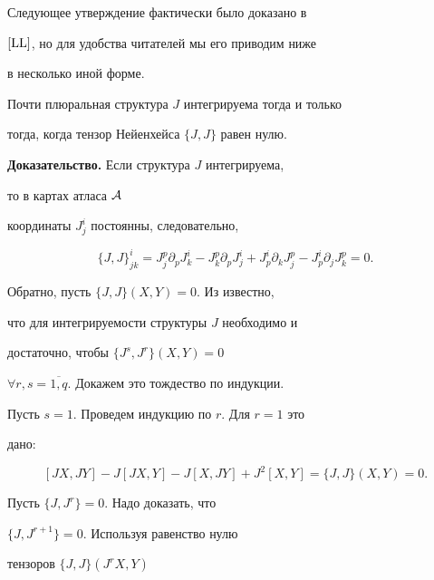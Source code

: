 Следующее утверждение фактически было доказано в


$\cite{LL}$, но для удобства читателей мы его приводим ниже


в несколько иной форме.





\begin{assrt}


Почти плюральная структура $J$ интегрируема тогда и только


тогда, когда тензор Нейенхейса $\{ J,J\}$ равен нулю.


\end{assrt}





{\bf Доказательство.} Если структура $J$ интегрируема,


то в картах атласа $\cal A$


координаты $J^{i}_{j}$ постоянны, следовательно,


$$


\{ J,J\}^{i}_{j k} = J^{p}_{j} \partial _{p} J^{i}_{k} -


J^{p}_{k} \partial _{p} J^{i}_{j} + J^{i}_{p} \partial _{k}


J^{p}_{j} - J^{i}_{p} \partial _{j} J^{p}_{k} = 0.


$$





Обратно, пусть $\{ J,J\} (X,Y) = 0$. Из \cite{Kru} известно,


что для интегрируемости структуры $J$ необходимо и


достаточно, чтобы $\{ J^{s},J^{r}\} (X,Y) = 0$


$\forall r,s = \overline{1,q}$. Докажем это тождество по индукции.





Пусть $s=1$. Проведем индукцию по $r$. Для $r = 1$ это


дано:


$$


[JX,JY] - J[JX,Y] - J[X,JY] + J^{2} [X,Y] = \{ J,J\}(X,Y)= 0.


$$


Пусть $\{ J,J^{r}\} = 0$. Надо доказать, что


$\{ J,J^{r+1} \}=0 $. Используя равенство нулю


тензоров $\{ J,J\}(J^{r}X,Y)$


